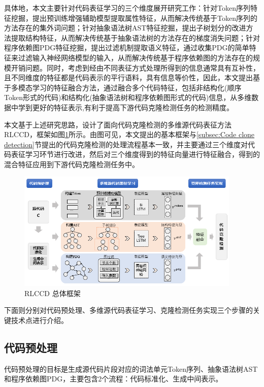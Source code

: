 具体地，本文主要针对代码表征学习的三个维度展开研究工作：针对Token序列特征挖掘，提出预训练增强辅助模型提取属性特征，从而解决传统基于Token序列的方法存在的集外词问题；针对抽象语法树AST特征挖掘，提出子树划分的改进方法提取结构特征，从而解决传统基于抽象语法树的方法存在的梯度消失问题；针对程序依赖图PDG特征挖掘，提出过滤机制提取语义特征，通过收集PDG的简单特征来过滤输入神经网络模型的输入，从而解决传统基于程序依赖图的方法存在的规模开销问题。同时，考虑到经由不同表征方式处理所得到的信息通常具有互补性，且不同维度的特征都是代码表示的平行语料，具有信息等价性，因此，本文提出基于多模态学习的特征融合方法，通过融合多个代码特征，包括非结构化(顺序Token形式的代码)和结构化(抽象语法树和程序依赖图形式的代码)信息，从多维数据中学到更好的特征表示,有利于提高下游代码克隆检测任务的检测精度。

本文基于上述研究思路，设计了面向代码克隆检测的多维源代码表征方法RLCCD，框架如图\ref{fig:framework}所示。由图可见，本文提出的基本框架与\ref{subsec:Code clone detection}节提出的代码克隆检测的处理流程基本一致，并主要通过三个维度对代码表征学习环节进行改进，然后对三个维度得到的特征向量进行特征融合，得到的混合特征应用到下游代码克隆检测任务中。

\begin{figure}[H]
    \centering
    \includegraphics[width=0.95\textwidth]{figures/framework}
    \caption{RLCCD 总体框架}
    \label{fig:framework}
\end{figure}

下面则分别对代码预处理、多维源代码表征学习、克隆检测任务实现三个步骤的关键技术点进行介绍。

\subsection{代码预处理}
\label{subsec:Preprocess}
代码预处理的目标是生成源代码片段对应的词法单元Token序列、抽象语法树AST和程序依赖图PDG，主要包含2个流程：代码标准化、生成中间表示。

